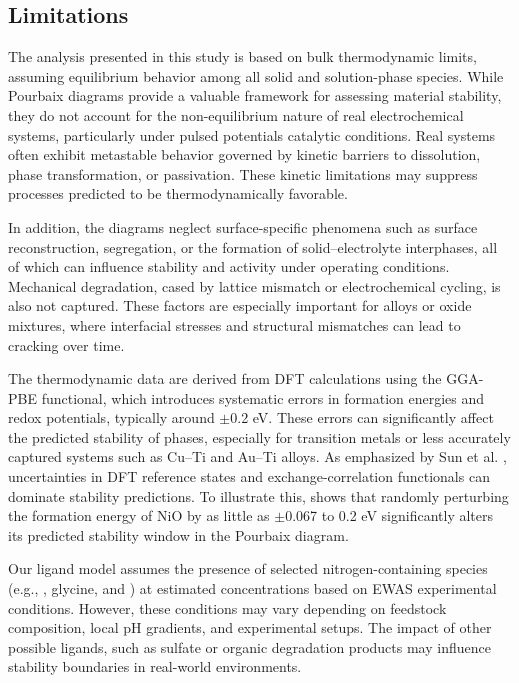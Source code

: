 \documentclass[journal=jacsat,manuscript=article]{achemso}
\begin{document}
\subsection{Limitations}
The analysis presented in this study is based on bulk thermodynamic limits, assuming equilibrium behavior among all solid and solution-phase species. While Pourbaix diagrams provide a valuable framework for assessing material stability, they do not account for the non-equilibrium nature of real electrochemical systems, particularly under pulsed potentials catalytic conditions. Real systems often exhibit metastable behavior governed by kinetic barriers to dissolution, phase transformation, or passivation. These kinetic limitations may suppress processes predicted to be thermodynamically favorable.

In addition, the diagrams neglect surface-specific phenomena such as surface reconstruction, segregation, or the formation of solid–electrolyte interphases, all of which can influence stability and activity under operating conditions. Mechanical degradation, cased by lattice mismatch or electrochemical cycling, is also not captured. These factors are especially important for alloys or oxide mixtures, where interfacial stresses and structural mismatches can lead to cracking over time.

The thermodynamic data are derived from DFT calculations using the GGA-PBE functional, which introduces systematic errors in formation energies and redox potentials, typically around $\pm$0.2 eV. These errors can significantly affect the predicted stability of phases, especially for transition metals or less accurately captured systems such as Cu–Ti and Au–Ti alloys. As emphasized by Sun et al. \cite{Sun2024AssessingStudy}, uncertainties in DFT reference states and exchange-correlation functionals can dominate stability predictions. To illustrate this,  shows that randomly perturbing the formation energy of NiO by as little as $\pm$0.067 to 0.2 eV significantly alters its predicted stability window in the Pourbaix diagram.

Our ligand model assumes the presence of selected nitrogen-containing species (e.g., , glycine, and ) at estimated concentrations based on EWAS experimental conditions. However, these conditions may vary depending on feedstock composition, local pH gradients, and experimental setups. The impact of other possible ligands, such as sulfate or organic degradation products may influence stability boundaries in real-world environments.
\end{document}
